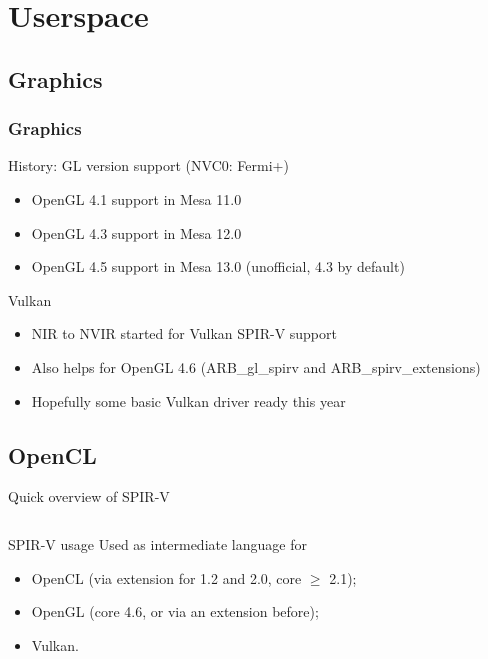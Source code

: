 \documentclass[11pt,english,compress]{beamer}
\begin{document}
\section{Userspace}
\subsection{Graphics}

\begin{frame}
	\frametitle{Graphics}

	\begin{block}{History: GL version support (NVC0: Fermi+)}
		\begin{itemize}
			\item OpenGL 4.1 support in Mesa 11.0
			\item OpenGL 4.3 support in Mesa 12.0
			\item OpenGL 4.5 support in Mesa 13.0 (unofficial, 4.3 by default)
		\end{itemize}
	\end{block}
	
	\pause
	
	\begin{block}{Vulkan}
		\begin{itemize}
			\item NIR to NVIR started for Vulkan SPIR-V support
			\item Also helps for OpenGL 4.6 (ARB\_gl\_spirv and ARB\_spirv\_extensions)
			\item Hopefully some basic Vulkan driver ready this year
		\end{itemize}
	\end{block}
\end{frame}

\subsection{OpenCL}

\begin{frame}{Quick overview of SPIR-V}
	\begin{columns}
		\begin{column}{\textwidth}
			\begin{block}{SPIR-V usage}
				Used as intermediate language for
				\begin{itemize}
					\item OpenCL (via extension for 1.2 and 2.0, core
						$\geq$ 2.1);
					\item OpenGL (core 4.6, or via an extension before);
					\item Vulkan.
				\end{itemize}
			\end{block}
		\end{column}
	\end{columns}
\end{frame}
\end{document}
